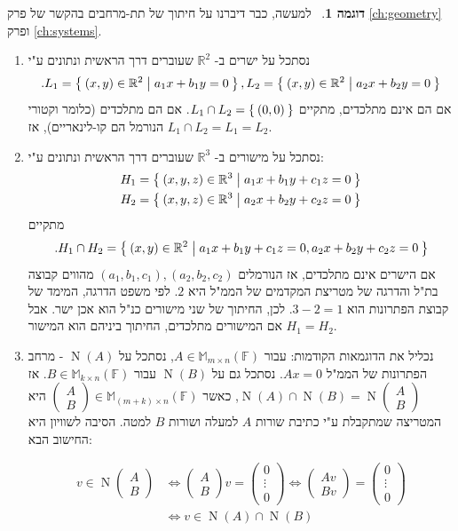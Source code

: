 \documentclass[12pt]{report}
\theoremstyle{plain}
\theoremstyle{definition}
\newtheorem{example}{דוגמה}[chapter]
\newcommand{\R}{\mathbb{R}}
\newcommand{\F}{\mathbb{F}}
\newcommand{\M}{\mathbb{M}}
\newcommand{\0}{\mathbf{0}}
\DeclareMathOperator{\Null}{N}
\begin{document}
\begin{example}\
למעשה, כבר דיברנו על חיתוך של תת-מרחבים בהקשר של פרק
\ref{ch:geometry}
ופרק
\ref{ch:systems}.

\begin{enumerate}[label=\alph*.]
\item 
נסתכל על ישרים ב-
$\R^2$
שעוברים דרך הראשית ונתונים ע"י
$$
.L_1=\Set{(x,y)\in\R^2|a_1x+b_1y=0},L_2=\Set{(x,y)\in\R^2|a_2x+b_2y=0}
$$
אם הם אינם מתלכדים, מתקיים
$L_1\cap L_2=\Set{(0,0)}$.
אם הם מתלכדים (כלומר וקטורי הנורמל הם קו-לינאריים), אז
$L_1\cap L_2=L_1=L_2$.


\item 
נסתכל על מישורים ב-
$\R^3$
שעוברים דרך הראשית ונתונים ע"י:
$$
\begin{aligned}
H_1&=\Set{(x,y,z)\in\R^3|a_1x+b_1y+c_1z=0} \\
H_2&=\Set{(x,y,z)\in\R^3|a_2x+b_2y+c_2z=0}
\end{aligned}
$$
מתקיים
$$
.H_1\cap H_2=\Set{(x,y)\in\R^2|a_1x+b_1y+c_1z=0,a_2x+b_2y+c_2z=0}
$$
אם הישרים אינם מתלכדים, אז הנורמלים
$(a_1,b_1,c_1),(a_2,b_2,c_2)$
מהווים קבוצה בת"ל והדרגה של מטריצת המקדמים של הממ"ל היא
$2$.
לפי משפט הדרגה, המימד של קבוצת הפתרונות הוא 
$3-2=1$.
לכן, החיתוך של שני מישורים כנ"ל הוא אכן ישר. אבל אם המישורים מתלכדים, החיתוך ביניהם הוא המישור
$H_1=H_2$.


\item 
נכליל את הדוגמאות הקודמות: עבור 
$A\in\M_{m\times n}(\F)$,
נסתכל על 
$\Null(A)$
- מרחב הפתרונות של הממ"ל 
$Ax=0$.
נסתכל גם על
$\Null(B)$ 
עבור
$B\in\M_{k\times n}(\F)$.
אז
$\Null(A)\cap \Null(B)=\Null\begin{pmatrix}
A \\
B
\end{pmatrix}$,
כאשר 
$\begin{pmatrix}
A \\
B
\end{pmatrix}\in\M_{(m+k)\times n}(\F)$
היא המטריצה שמתקבלת ע"י כתיבת שורות 
$A$
למעלה ושורות
$B$
למטה. הסיבה לשוויון היא החישוב הבא:

$$
\begin{aligned}
v\in \Null\begin{pmatrix}
A \\
B
\end{pmatrix} &\iff \begin{pmatrix}
A \\
B
\end{pmatrix}v=\begin{pmatrix}
0\\
\vdots\\
0
\end{pmatrix} \iff \begin{pmatrix}
Av \\
Bv
\end{pmatrix}=\begin{pmatrix}
0\\
\vdots\\
0
\end{pmatrix} \\
&\iff v\in\Null(A)\cap\Null(B)
\end{aligned}
$$




\end{enumerate}
\end{example}
\end{document}
